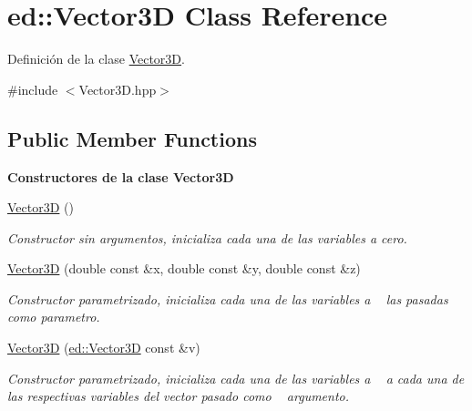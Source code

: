 \hypertarget{classed_1_1Vector3D}{}\section{ed\+:\+:Vector3D Class Reference}
\label{classed_1_1Vector3D}


Definición de la clase \mbox{\hyperlink{classed_1_1Vector3D}{Vector3D}}.  




{\ttfamily \#include $<$Vector3\+D.\+hpp$>$}

\subsection*{Public Member Functions}
\begin{Indent}\textbf{ Constructores de la clase Vector3D}\par
\begin{DoxyCompactItemize}
\item 
\mbox{\hyperlink{classed_1_1Vector3D_a6747bbbfd5d1fac542e46315aed209e5}{Vector3D}} ()
\begin{DoxyCompactList}\small\item\em Constructor sin argumentos, inicializa cada una de las variables a cero. \end{DoxyCompactList}\item 
\mbox{\hyperlink{classed_1_1Vector3D_ab338fbfc5e42af056568727cdfccb0f2}{Vector3D}} (double const \&x, double const \&y, double const \&z)
\begin{DoxyCompactList}\small\item\em Constructor parametrizado, inicializa cada una de las variables a ~\newline
 las pasadas como parametro. \end{DoxyCompactList}\item 
\mbox{\hyperlink{classed_1_1Vector3D_a777ab163dc0be27858fdfd4d4706ff40}{Vector3D}} (\mbox{\hyperlink{classed_1_1Vector3D}{ed\+::\+Vector3D}} const \&v)
\begin{DoxyCompactList}\small\item\em Constructor parametrizado, inicializa cada una de las variables a ~\newline
 a cada una de las respectivas variables del vector pasado como ~\newline
 argumento. \end{DoxyCompactList}\end{DoxyCompactItemize}
\end{Indent}
